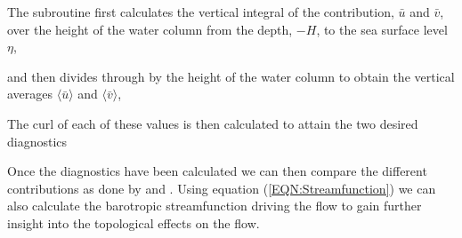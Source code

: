 \documentclass[..\report.tex]{subfiles}
\begin{document}
The subroutine first calculates the vertical integral of the contribution, $\bar{u}$ and $\bar{v}$, over the height of the water column from the depth, $-H$, to the sea surface level $\eta$,


and then divides through by the height of the water column to obtain the vertical averages $\langle\bar{u}\rangle$ and $\langle\bar{v}\rangle$,


The curl of each of these values is then calculated to attain the two desired diagnostics


    
Once the diagnostics have been calculated we can then compare the different contributions as done by \citet{Yeager2015} and \citet{Gula2014}. Using equation (\ref{EQN:Streamfunction}) we can also calculate the barotropic streamfunction driving the flow to gain further insight into the topological effects on the flow.
\end{document}
